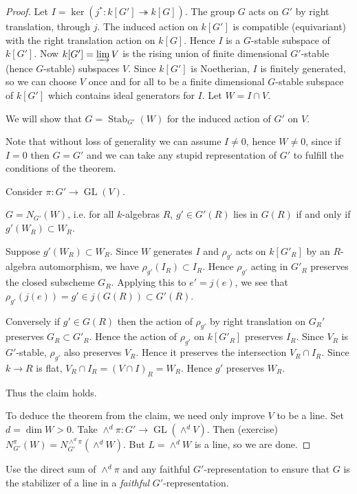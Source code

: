 \documentclass[10pt]{article}
\newcommand{\GL}{\operatorname{GL}}
\renewcommand{\(}{\left(}
\renewcommand{\)}{\right)}
\newcommand{\Stab}{\operatorname{Stab}}
\newcommand{\onto}{\twoheadrightarrow }
\numberwithin{thm}{subsection}
\begin{document}
\begin{proof} 
Let $I=\ker(j^*:k[G']\onto k[G])$.
The group $G$ acts on $G'$ by right translation, through $j$.
The induced action on $k[G']$ is compatible (equivariant) with the right translation action on $k[G]$.
Hence $I$ is a $G$-stable subspace of $k[G']$.
Now $k[G']=\varinjlim V$ is the rising union of finite dimensional $G'$-stable
(hence $G$-stable) subspaces $V$.
Since $k[G']$ is Noetherian, $I$ is finitely generated,
so we can choose $V$ once and for all
to be a finite dimensional $G$-stable subspace of $k[G']$
which contains ideal generators for $I$.
Let $W=I\cap V$.

We will show that $G=\Stab_{G'}(W)$ for the induced
action of $G'$ on $V$.

Note that without loss of generality we can
assume $I\neq 0$, hence $W\neq 0$,
since if $I=0$ then $G=G'$
and we can take any stupid representation of $G'$ to fulfill the conditions
of the theorem.

Consider $\pi:G'\to \GL(V)$.
\begin{claim}
$G=N_{G'}(W)$, i.e. for all $k$-algebras $R$,  $g'\in G'(R)$ lies in $G(R)$
if and only if $g'(W_R)\subset W_R$.
\end{claim}
Suppose $g'(W_R)\subset W_R$.
Since $W$ generates $I$
and $\rho_{g'}$ acts on $k[G'_R]$ by an $R$-algebra automorphism,
we have $\rho_{g'}(I_R)\subset I_R$.
Hence $\rho_{g'}$ acting in $G'_R$ preserves the closed
subscheme $G_R$.
Applying this to $e'=j(e)$, we see that $\rho_{g'}(j(e))=g'\in j(G(R))\subset G'(R)$.

Conversely if $g'\in G(R)$ then 
the action of $\rho_{g'}$ by right translation on $G_R'$ 
preserves $G_R\subset G'_R$.
Hence the action of $\rho_{g'}$
on $k[G'_R]$ preserves $I_R$.
Since $V_R$ is $G'$-stable, $\rho_{g'}$ also preserves $V_R$.
Hence it preserves the intersection $V_R\cap I_R$.
Since $k\to R$ is flat, $V_R\cap I_R=(V\cap I)_R=W_R$.
Hence $g'$ preserves $W_R$.

Thus the claim holds.

To deduce the theorem from the claim, we need only improve $V$ to be a line.
Set $d=\dim W>0$.
Take $\wedge^d\pi:G'\to \GL(\wedge^d V)$.
Then (exercise) $N^\pi_{G'}(W)=N^{\wedge^d\pi}_{G'}(\wedge^dW)$.
But $L=\wedge^dW$ is a line, so we are done.
\end{proof}
\begin{rem}
Use the direct sum of $\wedge^d\pi$ and any faithful $G'$-representation to 
ensure that $G$ is the stabilizer of a line in
a \textit{faithful} $G'$-representation.
\end{rem}
\end{document}
